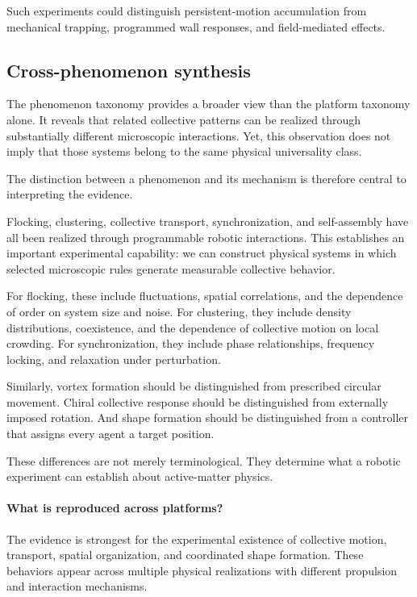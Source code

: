 Such experiments
could distinguish
persistent-motion
accumulation from
mechanical trapping,
programmed wall
responses, and
field-mediated
effects.

\subsection{Cross-phenomenon synthesis}
\label{sec:phenomena-cross}

The phenomenon taxonomy provides a broader view
than the platform taxonomy alone.
It reveals that related collective patterns
can be realized through substantially different
microscopic interactions. Yet, this observation
does not imply that those systems belong
to the same physical universality class.

The distinction between a phenomenon and
its mechanism is therefore central
to interpreting the evidence.

Flocking, clustering, collective transport,
synchronization, and self-assembly
have all been realized through
programmable robotic interactions.
This establishes an important
experimental capability:
we can construct physical
systems in which selected
microscopic rules generate
measurable collective behavior.



For flocking, these
include fluctuations,
spatial correlations,
and the dependence
of order on system
size and noise.
For clustering,
they include density
distributions,
coexistence,
and the dependence
of collective motion
on local crowding.
For synchronization,
they include phase
relationships,
frequency locking,
and relaxation
under perturbation.

Similarly, vortex
formation should
be distinguished
from prescribed
circular movement.
Chiral collective
response should
be distinguished
from externally
imposed rotation.
And shape formation
should be distinguished
from a controller
that assigns every
agent a target
position.

These differences
are not merely
terminological.
They determine
what a robotic
experiment can
establish about
active-matter
physics.

\paragraph*{What is reproduced across platforms?}

The evidence is strongest for the experimental
existence of collective motion, transport,
spatial organization, and coordinated
shape formation. These behaviors appear
across multiple physical realizations
with different propulsion and
interaction mechanisms.

